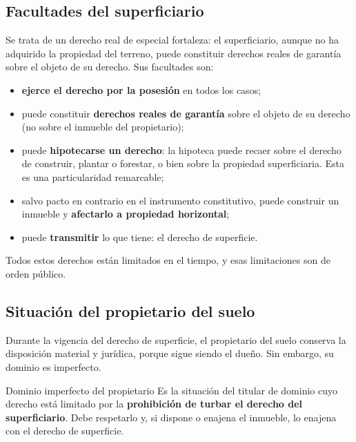 \documentclass[12pt,oneside]{book}
\begin{document}
\subsection{Facultades del superficiario}

Se trata de un derecho real de especial fortaleza: el superficiario, aunque no ha adquirido la propiedad del terreno, puede constituir derechos reales de garantía sobre el objeto de su derecho. Sus facultades son:

\begin{itemize}
    \item \textbf{ejerce el derecho por la posesión} en todos los casos;
    \item puede constituir \textbf{derechos reales de garantía} sobre el objeto de su derecho (no sobre el inmueble del propietario);
    \item puede \textbf{hipotecarse un derecho}: la hipoteca puede recaer sobre el derecho de construir, plantar o forestar, o bien sobre la propiedad superficiaria. Esta es una particularidad remarcable;
    \item salvo pacto en contrario en el instrumento constitutivo, puede construir un inmueble y \textbf{afectarlo a propiedad horizontal};
    \item puede \textbf{transmitir} lo que tiene: el derecho de superficie.
\end{itemize}

\begin{importante}
Todos estos derechos están limitados en el tiempo, y esas limitaciones son de orden público.
\end{importante}

\subsection{Situación del propietario del suelo}

Durante la vigencia del derecho de superficie, el propietario del suelo conserva la disposición material y jurídica, porque sigue siendo el dueño. Sin embargo, su dominio es imperfecto.

\begin{definicion}{Dominio imperfecto del propietario}
Es la situación del titular de dominio cuyo derecho está limitado por la \textbf{prohibición de turbar el derecho del superficiario}. Debe respetarlo y, si dispone o enajena el inmueble, lo enajena con el derecho de superficie.
\end{definicion}
\end{document}
